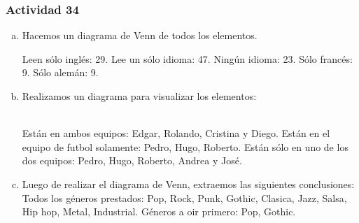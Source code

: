 \documentclass[a4paper, twocolumn]{article}
\begin{document}
\subsubsection*{Actividad 34}
\begin{enumerate}[a)]
\item Hacemos un diagrama de Venn de todos los elementos.


Leen sólo inglés: 29. Lee un sólo idioma: 47. Ningún idioma: 23. Sólo francés: 9. Sólo alemán: 9.
\item Realizamos un diagrama para visualizar los elementos:\\ \\

Están en ambos equipos: Edgar, Rolando, Cristina y Diego. 
Están en el equipo de futbol solamente: Pedro, Hugo, Roberto.
Están sólo en uno de los dos equipos: Pedro, Hugo, Roberto, Andrea y José.

\item Luego de realizar el diagrama de Venn, extraemos las siguientes conclusiones: Todos los géneros prestados: Pop, Rock, Punk, Gothic, Clasica, Jazz, Salsa, Hip hop, Metal, Industrial. Géneros a oir primero: Pop, Gothic.


\end{enumerate}
\end{document}
